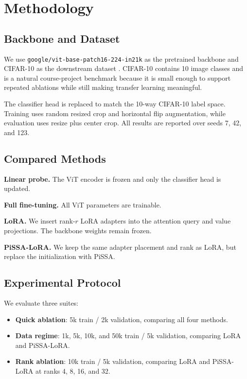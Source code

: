\documentclass{article}
\begin{document}
\section{Methodology}

\subsection{Backbone and Dataset}

We use \texttt{google/vit-base-patch16-224-in21k} as the pretrained backbone and CIFAR-10 as the downstream dataset \citep{krizhevsky2009cifar}. CIFAR-10 contains 10 image classes and is a natural course-project benchmark because it is small enough to support repeated ablations while still making transfer learning meaningful.

The classifier head is replaced to match the 10-way CIFAR-10 label space. Training uses random resized crop and horizontal flip augmentation, while evaluation uses resize plus center crop. All results are reported over seeds 7, 42, and 123.

\subsection{Compared Methods}

\textbf{Linear probe.} The ViT encoder is frozen and only the classifier head is updated.

\textbf{Full fine-tuning.} All ViT parameters are trainable.

\textbf{LoRA.} We insert rank-$r$ LoRA adapters into the attention query and value projections. The backbone weights remain frozen.

\textbf{PiSSA-LoRA.} We keep the same adapter placement and rank as LoRA, but replace the initialization with PiSSA.

\subsection{Experimental Protocol}

We evaluate three suites:

\begin{itemize}
\item \textbf{Quick ablation}: 5k train / 2k validation, comparing all four methods.
\item \textbf{Data regime}: 1k, 5k, 10k, and 50k train / 5k validation, comparing LoRA and PiSSA-LoRA.
\item \textbf{Rank ablation}: 10k train / 5k validation, comparing LoRA and PiSSA-LoRA at ranks 4, 8, 16, and 32.
\end{itemize}
\end{document}
